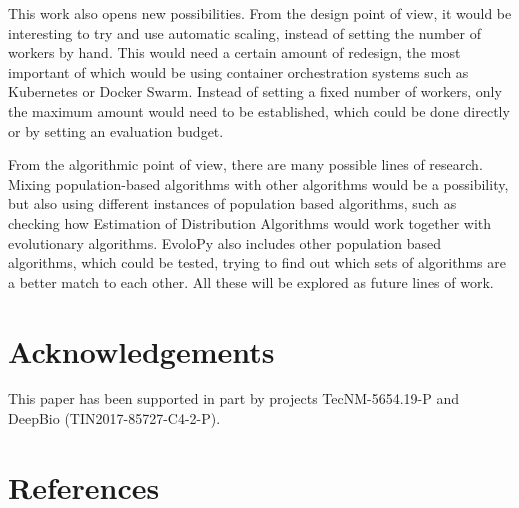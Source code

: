 \documentclass[review]{elsarticle}
\begin{document}


This work also opens new possibilities. From the design point of view, it
would be interesting to try and use automatic scaling, instead of
setting the number of workers by hand. This would need a certain
amount of redesign, the most important of which would be using
container orchestration systems such as Kubernetes or Docker
Swarm. Instead of setting a fixed number of workers, only the maximum
amount would need to be established, which could be done directly or
by setting an evaluation budget.

From the algorithmic point of view, there are many possible lines of
research. Mixing population-based algorithms with other algorithms
would be a possibility, but also using different instances of
population based algorithms, such as checking how Estimation of
Distribution Algorithms would work together with evolutionary
algorithms. EvoloPy also includes other population based algorithms,
which could be tested, trying to find out which sets of algorithms are
a better match to each other. All these will be explored as future
lines of work.

\section{Acknowledgements}

This paper has been supported in part by projects TecNM-5654.19-P and DeepBio
(TIN2017-85727-C4-2-P).

\section*{References}



\end{document}
